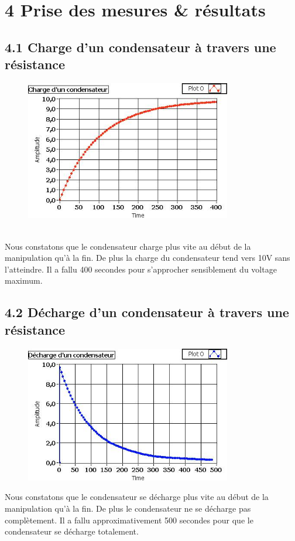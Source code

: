 \documentclass{report}
\begin{document}
\section*{4 Prise des mesures \& r\'esultats}
\subsection*{4.1 Charge d'un condensateur \`a travers une r\'esistance}
\hspace*{0.5cm}
\begin{figure}[ht!]
\centering
\includegraphics[width=90mm]{chargeCond.jpg}
\label{overflow}
\end{figure}
\\
\hspace*{0.5cm}
Nous constatons que le condensateur charge plus vite au d\'ebut de la manipulation qu'\`a la fin. De plus la charge du condensateur tend vers 10V sans l'atteindre. Il a fallu 400 secondes pour s'approcher sensiblement du voltage maximum.
\pagebreak
\subsection*{4.2 D\'echarge d'un condensateur \`a travers une r\'esistance}
\begin{figure}[ht!]
\centering
\includegraphics[width=90mm]{dechargeCond.jpg}
\label{overflow}
\end{figure}
\hspace*{0.5cm}
Nous constatons que le condensateur se d\'echarge plus vite au d\'ebut de la manipulation qu'\`a la fin. De plus le condensateur ne se d\'echarge pas compl\`etement. Il a fallu approximativement 500 secondes pour que le condensateur se d\'echarge totalement.
\pagebreak
\end{document}
